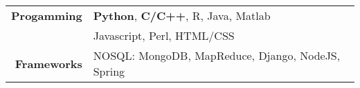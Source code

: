 
\tabcolsep=0.11cm
\begin{tabular}{rl}
  \textbf{Progamming} & {\bf Python}, {\bf C/C++}, R, Java, Matlab \\
                      & Javascript, Perl, HTML/CSS\\
  \textbf{Frameworks} & NOSQL: MongoDB, MapReduce, Django, NodeJS, Spring \\
\end{tabular}



